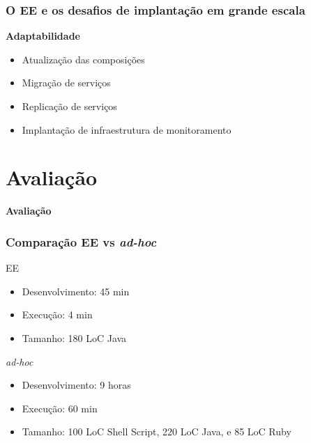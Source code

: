 \documentclass{beamer}
\newcommand\adhoc{\emph{ad-hoc}\xspace}
\newcommand\sectiontitle[1]{\begin{center}\huge\textbf{#1}\end{center}}
\newcommand\subtitulo[1]{{\large \textbf{#1}}}
\begin{document}

\begin{frame}
\frametitle{O EE e os desafios de implantação em grande escala}

\subtitulo{Adaptabilidade}

\vspace{1cm}

\begin{itemize}
\item Atualização das composições
\item Migração de serviços
\item Replicação de serviços
\item Implantação de infraestrutura de monitoramento
\end{itemize}

\end{frame}



\section{Avaliação}

\begin{frame}

\sectiontitle{Avaliação}

\end{frame}



\begin{frame}
\frametitle{Comparação EE vs \adhoc}

\begin{block}{EE}
\begin{itemize}
\item Desenvolvimento: 45 min
\item Execução: 4 min
\item Tamanho: 180 LoC Java
\end{itemize}
\end{block}

\vspace{0.6cm}

\begin{block}{\adhoc}
\begin{itemize}
\item Desenvolvimento: 9 horas
\item Execução: 60 min
\item Tamanho: 100 LoC Shell Script, 220 LoC Java, e 85 LoC Ruby
\end{itemize}
\end{block}

\end{frame}
\end{document}
